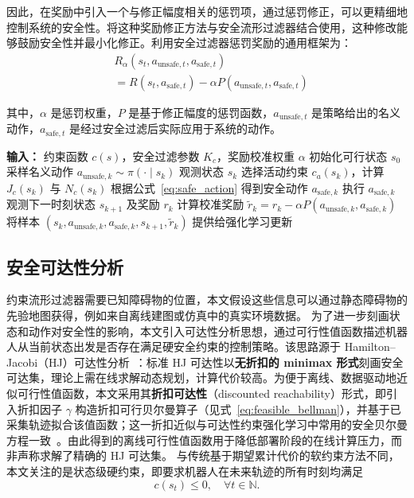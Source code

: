 因此，在奖励中引入一个与修正幅度相关的惩罚项，通过惩罚修正，可以更精细地控制系统的安全性。将这种奖励修正方法与安全流形过滤器结合使用，这种修改能够鼓励安全性并最小化修正。利用安全过滤器惩罚奖励的通用框架为：
\begin{equation}
    \begin{split}
        &R_{\alpha}(s_t,a_{\text{unsafe},t},a_{\text{safe},t}) \\
        &=R(s_t,a_{\text{safe},t})-\alpha P(a_{\text{unsafe},t},a_{\text{safe},t})
    \end{split}
\end{equation}

其中，$\alpha$ 是惩罚权重，$P$ 是基于修正幅度的惩罚函数，$a_{\text{unsafe},t}$ 是策略给出的名义动作，$a_{\text{safe},t}$ 是经过安全过滤后实际应用于系统的动作。

\begin{algorithm}
\caption{基于约束流形过滤的安全强化学习方法（CMPL）}
\label{alg:cmpl}
\begin{algorithmic}[1]
\STATE \textbf{输入：} 约束函数 $c(s)$，安全过滤参数 $K_c$，奖励校准权重 $\alpha$
    \STATE 初始化可行状态 $s_0$
        \STATE 采样名义动作 $a_{\text{unsafe},k} \sim \pi(\cdot \mid s_k)$
        \STATE 观测状态 $s_k$
        \STATE 选择活动约束 $c_a(s_k)$，计算 $J_c(s_k)$ 与 $N_c(s_k)$
        \STATE 根据公式~\eqref{eq:safe_action} 得到安全动作 $a_{\text{safe},k}$
        \STATE 执行 $a_{\text{safe},k}$
        \STATE 观测下一时刻状态 $s_{k+1}$ 及奖励 $r_k$
        \STATE 计算校准奖励 $\tilde{r}_k=r_k-\alpha P(a_{\text{unsafe},k},a_{\text{safe},k})$
        \STATE 将样本 $(s_k,a_{\text{unsafe},k},a_{\text{safe},k},s_{k+1},\tilde{r}_k)$ 提供给强化学习更新
    \ENDFOR
\ENDFOR
\end{algorithmic}
\end{algorithm}

\subsection{安全可达性分析}
约束流形过滤器需要已知障碍物的位置，本文假设这些信息可以通过静态障碍物的先验地图获得，例如来自离线建图或仿真中的真实环境数据。
为了进一步刻画状态和动作对安全性的影响，本文引入可达性分析思想，通过可行性值函数描述机器人从当前状态出发是否存在满足硬安全约束的控制策略。该思路源于 Hamilton–Jacobi（HJ）可达性分析~\cite{bansal2017hj_reachability,bansal2021deepreach}：标准 HJ 可达性以\textbf{无折扣的 minimax 形式}刻画安全可达集，理论上需在线求解动态规划，计算代价较高。为便于离线、数据驱动地近似可行性值函数，本文采用其\textbf{折扣可达性}（discounted reachability）形式，即引入折扣因子 $\gamma$ 构造折扣可行贝尔曼算子（见式~\eqref{eq:feasible_bellman}），并基于已采集轨迹拟合该值函数；这一折扣近似与可达性约束强化学习中常用的安全贝尔曼方程一致~\cite{ganai2023iterative_reachability,hsu2024safety_filter}。由此得到的离线可行性值函数用于降低部署阶段的在线计算压力，而非声称求解了精确的 HJ 可达集。
与传统基于期望累计代价的软约束方法不同，本文关注的是状态级硬约束，即要求机器人在未来轨迹的所有时刻均满足
\begin{equation}
    c(s_t)\leq 0,\quad \forall t\in\mathbb{N}.
\end{equation}

